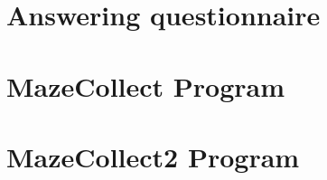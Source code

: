 

\usepackage{lipsum}




\tableofcontents
\thispagestyle{empty}	%
\newpage
{} %

\section{Answering questionnaire}

\section{MazeCollect Program}

\section{MazeCollect2 Program}




